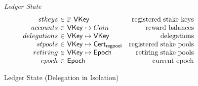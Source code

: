 \documentclass[11pt,a4paper]{article}
\newcommand{\powerset}[1]{\mathbb{P}~#1}
\newcommand{\type}[1]{\mathsf{#1}}
\begin{document}
\begin{figure}

\emph{Ledger State}
%
\begin{equation*}
\begin{array}{r@{~\in~}lr}
stkeys & \powerset{\type{VKey}} & \text{registered stake keys}
\\
accounts & \type{VKey} \mapsto Coin & \text{reward balances}
\\
delegations & \type{VKey} \mapsto \type{VKey} & \text{delegations}
\\
stpools & \type{VKey} \mapsto \type{Cert_{regpool}} & \text{registered stake pools}
\\
retiring & \type{VKey} \mapsto \type{Epoch} & \text{retiring stake pools}
\\
epoch & \type{Epoch} & \text{current epoch}

\end{array}
\end{equation*}

\caption{Ledger State (Delegation in Isolation)}
\label{fig:delegation_ledger_state}
\end{figure}

\end{document}
